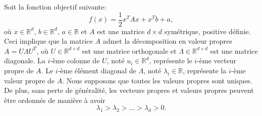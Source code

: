 \documentclass[11pt,french,english]{article}
\newcommand{\french}[1]{ {\color{blue} #1} }
\begin{document}
\begin{enumerate}
\french{    Soit la fonction objectif suivante: 
    $$
        f(x) = \frac{1}{2} x^T A x + x^T b + a,
    $$
    où $x \in \mathbb{R}^d$,
    $b \in \mathbb{R}^d$,
    $a \in \mathbb{R}$ et $A$ est une matrice $d \times d$ symétrique, positive définie.
    Ceci implique que la matrice $A$ admet la décomposition en valeur propres $A=U \Lambda U^T$,
    où $U \in \mathbb{R}^{d \times d}$ est une matrice orthogonale et $\Lambda  \in \mathbb{R}^{d \times d}$ est une matrice diagonale.
    La $i$-ème colonne de $U$, noté $u_i \in \mathbb{R}^d$, représente le $i$-ème vecteur propre de $A$.
    Le $i$-ème élément diagonal de $\Lambda$, noté $\lambda_i \in \mathbb{R}$, représente la $i$-ème valeur propre de $A$. Nous supposons que toutes les valeurs propres sont uniques. De plus, sans perte de généralité, les vecteurs propres et valeurs propres peuvent être ordonnés de manière à avoir
    $$
        \lambda_1 > \lambda_2 > \ldots
        > \lambda_d > 0.
    $$
}
    

\end{enumerate}
\end{document}
